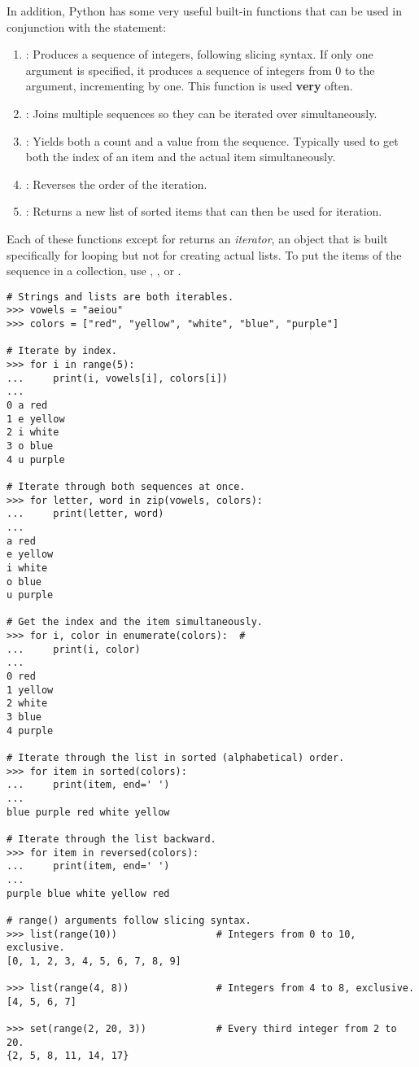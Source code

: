 In addition, Python has some very useful built-in functions that can be used in conjunction with the  statement:
\begin{enumerate}
\item {}: Produces a sequence of integers, following slicing syntax.
If only one argument is specified, it produces a sequence of integers from 0 to the argument, incrementing by one.
This function is used \textbf{very} often.
\item {}: Joins multiple sequences so they can be iterated over simultaneously.
\item {}: Yields both a count and a value from the sequence. Typically used to get both the index of an item and the actual item simultaneously.
\item {}: Reverses the order of the iteration.
\item {}: Returns a new list of sorted items that can then be used for iteration.
\end{enumerate}
Each of these functions except for  returns an \emph{iterator}, an object that is built specifically for looping but not for creating actual lists.
To put the items of the sequence in a collection, use , , or .

\begin{lstlisting}
# Strings and lists are both iterables.
>>> vowels = "aeiou"
>>> colors = ["red", "yellow", "white", "blue", "purple"]

# Iterate by index.
>>> for i in range(5):
...     print(i, vowels[i], colors[i])
...
0 a red
1 e yellow
2 i white
3 o blue
4 u purple

# Iterate through both sequences at once.
>>> for letter, word in zip(vowels, colors):
...     print(letter, word)
...
a red
e yellow
i white
o blue
u purple

# Get the index and the item simultaneously.
>>> for i, color in enumerate(colors):  #
...     print(i, color)
...
0 red
1 yellow
2 white
3 blue
4 purple

# Iterate through the list in sorted (alphabetical) order.
>>> for item in sorted(colors):
...     print(item, end=' ')
...
blue purple red white yellow

# Iterate through the list backward.
>>> for item in reversed(colors):
...     print(item, end=' ')
...
purple blue white yellow red

# range() arguments follow slicing syntax.
>>> list(range(10))                 # Integers from 0 to 10, exclusive.
[0, 1, 2, 3, 4, 5, 6, 7, 8, 9]

>>> list(range(4, 8))               # Integers from 4 to 8, exclusive.
[4, 5, 6, 7]

>>> set(range(2, 20, 3))            # Every third integer from 2 to 20.
{2, 5, 8, 11, 14, 17}
\end{lstlisting}


